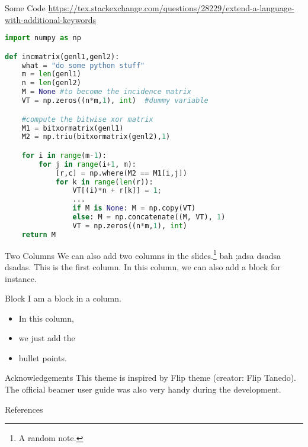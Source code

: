 \documentclass{corpborepres}
\begin{document}
\begin{frame}{Some Code}  %
	\url{https://tex.stackexchange.com/questions/28229/extend-a-language-with-additional-keywords}
\begin{lstlisting}[language=Python]
import numpy as np

def incmatrix(genl1,genl2):
	what = "do some python stuff"
    m = len(genl1)
    n = len(genl2)
    M = None #to become the incidence matrix
    VT = np.zeros((n*m,1), int)  #dummy variable

    #compute the bitwise xor matrix
    M1 = bitxormatrix(genl1)
    M2 = np.triu(bitxormatrix(genl2),1)

    for i in range(m-1):
        for j in range(i+1, m):
            [r,c] = np.where(M2 == M1[i,j])
            for k in range(len(r)):
                VT[(i)*n + r[k]] = 1;
    			...
                if M is None: M = np.copy(VT)
                else: M = np.concatenate((M, VT), 1)
                VT = np.zeros((n*m,1), int)
    return M
\end{lstlisting}
\end{frame}

	\begin{frame}{Two Columns}
		We can also add two columns in the slides.\footnote[frame]{A random note.} bah ;adsa dsadsa dsadas.
		\begColFF
				This is the first column. In this column, we can also add a block for instance.
				\vspace{1em}
				\begin{block}{Block}
					I am a block in a column.
				\end{block}
			\nextColFF
				\begin{itemize}
					\item In this column,
					\item we just add the
					\item bullet points.
				\end{itemize}
			\endColFF
	\end{frame}

	\begin{frame}{Acknowledgements}
		This theme is inspired by Flip theme (creator: Flip Tanedo). The official beamer user guide was also very handy during the development.
	\end{frame}

	\begin{frame}[allowframebreaks]{References}
%		
%		
	\end{frame}
\end{document}
